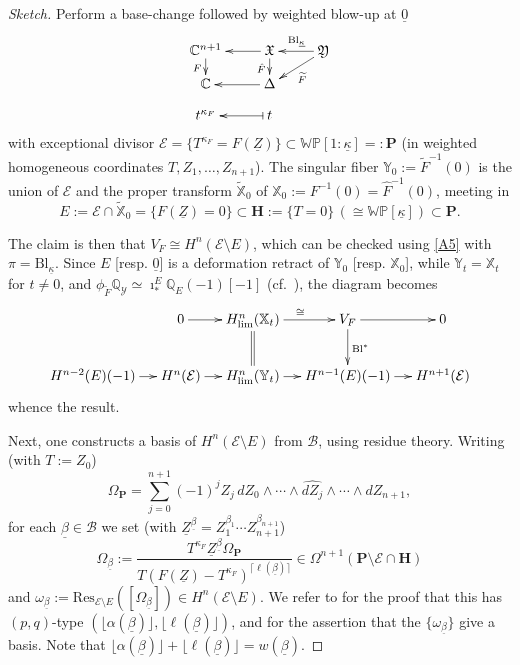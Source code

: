\documentclass[12pt,letterpaper,english]{amsart}
\numberwithin{equation}{section}
\numberwithin{figure}{section}
\theoremstyle{plain}
\theoremstyle{remark}
\theoremstyle{definition}
\theoremstyle{definition}
\theoremstyle{plain}
\theoremstyle{plain}
\theoremstyle{plain}
\theoremstyle{plain}
\theoremstyle{definition}
\def\uo{\underline{0}}
\def\QQ{\mathbb{Q}}
\def\CC{\mathbb{C}}
\def\E{\mathcal{E}}
\def\sm{\setminus}
\theoremstyle{definition}
\begin{document}
\begin{proof}[Sketch]
Perform a base-change followed by weighted blow-up at $\uo$
\begin{equation}\label{B4}
\xymatrix@R=0.8pc{\CC^{n+1} \ar [d]_F & \mathfrak{X} \ar [d]_{\hat{F}} \ar [l] & \mathfrak{Y} \ar [l]_{\mathrm{Bl}_{\underline{\kappa}}} \ar [ld]^{\widetilde{F}}	\\
\CC & \Delta \ar [l] \\ t^{\kappa_F} & t \ar @{|->} [l]}
\end{equation}
with exceptional divisor $\E=\{T^{\kappa_F}=F(\underline{Z})\}\subset \mathbb{WP}[1{:}\underline{\kappa}]=:\mathbf{P}$ (in weighted homogeneous coordinates $T,Z_1,\ldots,Z_{n+1}$).  The singular fiber $\mathbb{Y}_0:=\widetilde{F}^{-1}(0)$ is the union of $\E$ and the proper transform $\widetilde{\mathbb{X}}_0$ of $\mathbb{X}_0:=F^{-1}(0)=\hat{F}^{-1}(0)$, meeting in 
$$E:=\E\cap \widetilde{\mathbb{X}}_0=\{F(\underline{Z})=0\}\subset \mathbf{H}:=\{T=0\}\,(\cong \mathbb{WP}[\underline{\kappa}])\subset \mathbf{P}.$$

The claim is then that $V_F\cong H^n(\E\setminus E)$, which can be checked using \eqref{A5} with $\pi=\mathrm{Bl}_{\underline{\kappa}}$.  Since $E$ [resp. $\uo$] is a deformation retract of $\mathbb{Y}_0$ [resp. $\mathbb{X}_0$], while $\mathbb{Y}_t=\mathbb{X}_t$ for $t\neq 0$, and $\phi_{\widetilde{F}}\QQ_{\mathcal{Y}}\simeq \imath^E_*\QQ_E(-1)[-1]$ (cf.~\cite[6.3 and 8.3-4]{KL1}), the diagram becomes
$$\xymatrix@C=1pc{&0\ar[r] & H^n_{\lim}(\mathbb{X}_t)\ar [r]^{\cong} \ar @{=} [d] & V_F \ar [d]^{\mathrm{Bl}^*} \ar [r] & 0 \\ H^{n-2}(E)(-1)\ar [r] & H^n(\E) \ar [r] & H^n_{\lim}(\mathbb{Y}_t) \ar [r] & H^{n-1}(E)(-1) \ar [r] & H^{n+1}(\E)}$$
whence the result.

Next, one constructs a basis of $H^n(\E\sm E)$ from $\mathcal{B}$, using residue theory.  Writing (with $T:=Z_0$) 
$$\Omega_{\mathbf{P}}=\sum_{j=0}^{n+1} (-1)^j Z_j\, dZ_0\wedge\cdots \wedge \widehat{dZ_j}\wedge \cdots \wedge dZ_{n+1},$$
for each $\underline{\beta}\in \mathcal{B}$ we set (with $\underline{Z}^{\underline{\beta}}=Z_1^{\beta_1}\cdots Z_{n+1}^{\beta_{n+1}}$)
\begin{equation}\label{B5}
\Omega_{\underline{\beta}}:=\frac{T^{\kappa_F}\underline{Z}^{\underline{\beta}}\Omega_{\mathbf{P}}}{T(F(\underline{Z})-T^{\kappa_F})^{\lceil \ell(\underline{\beta})\rceil}}\in \Omega^{n+1}(\mathbf{P}\sm\E\cap\mathbf{H})
\end{equation}
and $\omega_{\underline{\beta}}:=\mathrm{Res}_{\E\sm E}([\Omega_{\underline{\beta}}])\in H^n(\E\sm E)$.  We refer to \cite[Thm.~2.2]{KL2} for the proof that this has $(p,q)$-type $(\lfloor\alpha(\underline{\beta})\rfloor,\lfloor\ell(\underline{\beta})\rfloor)$, and \cite[Thm.~1]{St} for the assertion that the $\{\omega_{\underline{\beta}}\}$ give a basis.  Note that $\lfloor\alpha(\underline{\beta})\rfloor+\lfloor\ell(\underline{\beta})\rfloor=w(\underline{\beta})$.


\end{proof}
\end{document}

